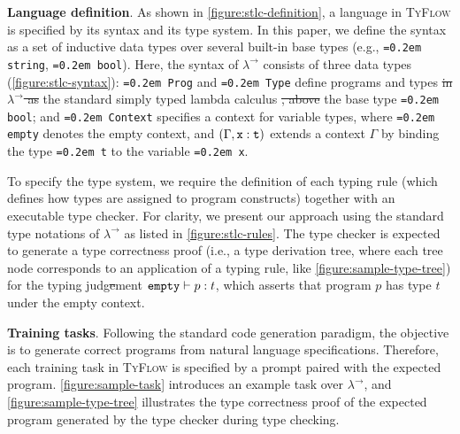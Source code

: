\documentclass[manuscript,screen]{acmart}
\makeatletter
\newcommand{\stlctype}[3]{{#1} \vdash {#2} : {#3}}
\newcommand{\toolname}[1]{\textsc{#1}}
\newcommand{\tcode}[1]{{\small \texttt{\spaceskip=0.2em #1}}}
\newcommand{\mainname}{\toolname{TyFlow}\xspace}
\newcommand{\stlc}{\lambda^{\rightarrow}}
\providecommand{\DIFadd}[1]{{\protect\color{blue}\uwave{#1}}} %
\providecommand{\DIFdel}[1]{{\protect\color{red}\sout{#1}}} %
\providecommand{\DIFaddbegin}{} %
\providecommand{\DIFaddend}{} %
\providecommand{\DIFdelbegin}{} %
\providecommand{\DIFdelend}{} %
\providecommand{\DIFscaledelfig}{0.5}
\newlength{\DIFdelgraphicswidth} %
\newlength{\DIFdelgraphicsheight} %
\providecommand{\DIFaddincludegraphics}[2][]{{\color{blue}\fbox{\DIFOincludegraphics[#1]{#2}}}} %
\providecommand{\DIFdelincludegraphics}[2][]{%
\sbox{\DIFdelgraphicsbox}{\DIFOincludegraphics[#1]{#2}}%
\settoboxwidth{\DIFdelgraphicswidth}{\DIFdelgraphicsbox} %
\settoboxtotalheight{\DIFdelgraphicsheight}{\DIFdelgraphicsbox} %
\scalebox{\DIFscaledelfig}{%
\parbox[b]{\DIFdelgraphicswidth}{\usebox{\DIFdelgraphicsbox}\\[-\baselineskip] \rule{\DIFdelgraphicswidth}{0em}}\llap{\resizebox{\DIFdelgraphicswidth}{\DIFdelgraphicsheight}{%
\setlength{\unitlength}{\DIFdelgraphicswidth}%
\begin{picture}(1,1)%
\thicklines\linethickness{2pt} %
{\color[rgb]{1,0,0}\put(0,0){\framebox(1,1){}}}%
{\color[rgb]{1,0,0}\put(0,0){\line( 1,1){1}}}%
{\color[rgb]{1,0,0}\put(0,1){\line(1,-1){1}}}%
\end{picture}%
}\hspace*{3pt}}} %
} %
\DeclareRobustCommand{\DIFaddbegin}{\DIFOaddbegin \let\includegraphics\DIFaddincludegraphics} %
\DeclareRobustCommand{\DIFaddend}{\DIFOaddend \let\includegraphics\DIFOincludegraphics} %
\DeclareRobustCommand{\DIFdelbegin}{\DIFOdelbegin \let\includegraphics\DIFdelincludegraphics} %
\DeclareRobustCommand{\DIFdelend}{\DIFOaddend \let\includegraphics\DIFOincludegraphics} %
\let\sout@orig\sout %
\renewcommand{\sout}[1]{\ifmmode\text{\sout@orig{\ensuremath{#1}}}\else\sout@orig{#1}\fi} %
\makeatother
\begin{document}
\smallskip 
\noindent \textbf{Language definition}. As shown in \autoref{figure:stlc-definition}, a language in \mainname is specified by its syntax and its type system.
%
In this paper, we define the syntax as a set of inductive data types over several built-in base types (e.g., \tcode{string}, \tcode{bool}). 
Here, the syntax of $\stlc$ consists of three data types (\autoref{figure:stlc-syntax}):
\tcode{Prog} and \tcode{Type} define programs and types \DIFdelbegin \DIFdel{in $\stlc$ as }\DIFdelend \DIFaddbegin \DIFadd{of }\DIFaddend the standard simply typed lambda calculus \DIFdelbegin \DIFdel{, above }\DIFdelend \DIFaddbegin \DIFadd{over }\DIFaddend the base type \tcode{bool}; and 
\tcode{Context} specifies a context for variable types, where \tcode{empty} denotes the empty context, and ${({\Gamma}, {\tt x}:{\tt t})}$ extends a context $\Gamma$ by binding the type \tcode{t} to the variable \tcode{x}.

To specify the type system, we require the definition of each typing rule (which defines how types are assigned to program constructs) together with an executable type checker.
For clarity, we present our approach using the standard type notations of $\stlc$ as listed in \autoref{figure:stlc-rules}.
The type checker is expected to generate a type correctness proof (i.e., a type derivation tree, where each tree node corresponds to an application of a typing rule, like \autoref{figure:sample-type-tree}) for the typing judg\DIFdelbegin \DIFdel{e}\DIFdelend ment $\stlctype{\tt empty}{p}{t}$, which asserts that program $p$ has type $t$ under the empty context.

\smallskip 
\noindent \textbf{Training tasks}. Following the standard code generation paradigm, the objective is to generate correct programs from natural language specifications. Therefore, each training task in \mainname is specified by a prompt paired with the expected program.
%
\autoref{figure:sample-task} introduces an example task over $\stlc$, and \autoref{figure:sample-type-tree} illustrates the type correctness proof of the expected program generated by the type checker during type checking.
\end{document}
